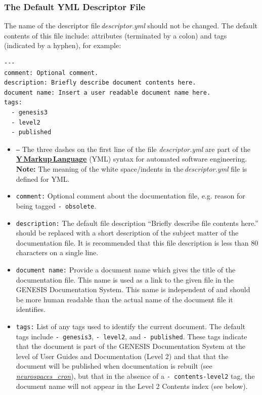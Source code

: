 \documentclass[12pt]{article}
\begin{document}
\subsubsection*{The Default YML Descriptor File}

The name of the descriptor file\,{\it descriptor.yml} should not be changed. The default contents of this file include: attributes (terminated by a colon) and tags (indicated by a hyphen), for example:

\begin{verbatim}
---
comment: Optional comment.
description: Briefly describe document contents here. 
document name: Insert a user readable document name here.
tags:
  - genesis3
  - level2
  - published
\end{verbatim}

\begin{itemize}

\item {\tt ---} The three dashes on the first line of the file {\it descriptor.yml} are part of the \href{http://fdik.org/yml/}{\bf Y\,Markup\,Language} (YML) syntax for automated software engineering. \\
{\bf Note:} The meaning of the white space/indents in the\,{\it descriptor.yml} file is defined for YML.

\item {\tt comment:} Optional comment about the documentation file, e.g. reason for being tagged {\tt -\,obsolete}.

\item {\tt description:} The default file description ``Briefly describe file contents here.'' should be replaced with a short description of the subject matter of the documentation file. It is recommended that this file description is less than 80 characters on a single line.

\item {\tt document name:} Provide a document name which gives the title of the documentation file. This name is used as a link to the given file in the GENESIS Documentation System. This name is independent of and should be more human readable than the actual name of the document file it identifies.

\item {\tt tags:} List of any tags used to identify the current document. The default tags include {\tt -\,genesis3}, {\tt -\,level2}, and {\tt -\,published}. These tags indicate that the document is part of the GENESIS Documentation System at the level of User Guides and Documentation (Level 2) and that that the document will be published when documentation is rebuilt (see \href{../neurospaces-cron/neurospaces-cron.tex}{\it neurospaces\_cron}), but that in the absence of a {\tt - contents-level2} tag, the document name will not appear in the Level 2 Contents index (see below).


\end{itemize}
\end{document}
